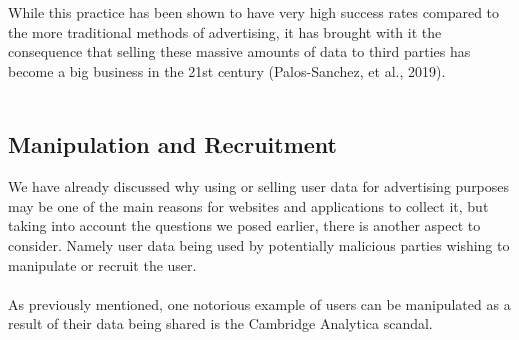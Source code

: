 \documentclass[11pt]{article}
\begin{document}
While this practice has been shown to have very high success rates compared to the more traditional methods of advertising, it has brought with it the consequence that selling these massive amounts of data to third parties has become a big business in the 21st century (Palos-Sanchez, et al., 2019). \\ \\

\subsection{Manipulation and Recruitment}
We have already discussed why using or selling user data for advertising purposes may be one of the main reasons for websites and applications to collect it, but taking into account the questions we posed earlier, there is another aspect to consider. Namely user data being used by potentially malicious parties wishing to manipulate or recruit the user.\\ \\ 

As previously mentioned, one notorious example of users can be manipulated as a result of their data being shared is the Cambridge Analytica scandal. \\ \\
\end{document}
